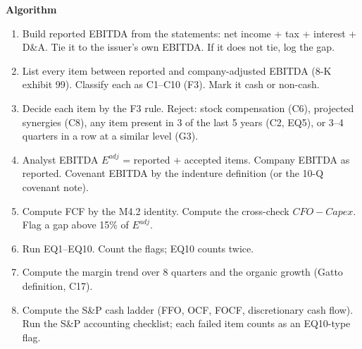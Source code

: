 \documentclass[11pt]{article}
\newcommand{\fld}[1]{\par\medskip\noindent\textbf{\textcolor{steel}{#1}}\par\nopagebreak}
\begin{document}
\fld{Algorithm}
\begin{algobox}
\begin{enumerate}
\item Build reported EBITDA from the statements: net income + tax + interest + D\&A. Tie it to the issuer's own EBITDA. If it does not tie, log the gap.
\item List every item between reported and company-adjusted EBITDA (8-K exhibit 99). Classify each as C1--C10 (F3). Mark it cash or non-cash.
\item Decide each item by the F3 rule. Reject: stock compensation (C6), projected synergies (C8), any item present in 3 of the last 5 years (C2, EQ5), or 3--4 quarters in a row at a similar level (G3).
\item Analyst EBITDA $E^{adj}$ = reported + accepted items. Company EBITDA as reported. Covenant EBITDA by the indenture definition (or the 10-Q covenant note).
\item Compute FCF by the M4.2 identity. Compute the cross-check $CFO - Capex$. Flag a gap above 15\% of $E^{adj}$.
\item Run EQ1--EQ10. Count the flags; EQ10 counts twice.
\item Compute the margin trend over 8 quarters and the organic growth (Gatto definition, C17).
\item Compute the S\&P cash ladder (FFO, OCF, FOCF, discretionary cash flow). Run the S\&P accounting checklist; each failed item counts as an EQ10-type flag.
\end{enumerate}
\end{algobox}
\end{document}
